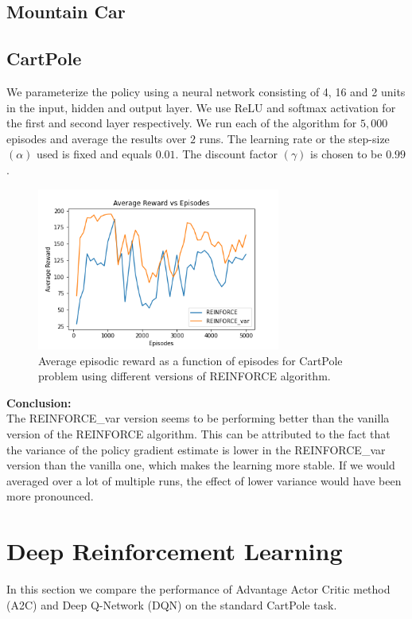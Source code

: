 \documentclass{article}
\begin{document}
    \subsection{Mountain Car}

    \subsection{CartPole}
    We parameterize the policy using a neural network consisting of 4, 16 and 2 units in the input, hidden and output layer. We use ReLU and softmax activation for
    the first and second layer respectively. We run each of the algorithm for $5,000$ episodes and average the results over $2$ runs. 
    The learning rate or the step-size $(\alpha)$ used is fixed and equals $0.01$. The discount factor $(\gamma)$ is chosen to be $0.99$.
    
    \begin{figure}[H]
        \graphicspath{ {../Experiments/Linear_Function_Approximation/} }
        \begin{center}
        \includegraphics[width=8cm]{Cartpole_reinforce.png}
        \end{center}
        \caption{Average episodic reward as a function of episodes for CartPole problem using different versions of REINFORCE algorithm.}
        \label{}
    \end{figure}

    \noindent %
    \textbf{Conclusion:} \\
    The REINFORCE\_var version seems to be performing better than the vanilla version of the REINFORCE algorithm. This can be
    attributed to the fact that the variance of the policy gradient estimate is lower in the REINFORCE\_var version than the
    vanilla one, which makes the learning more stable. If we would averaged over a lot of multiple runs, the effect of lower
    variance would have been more pronounced.
    
\section{Deep Reinforcement Learning}
    In this section we compare the performance of Advantage Actor Critic method (A2C) and Deep Q-Network (DQN) on the standard CartPole task.
\end{document}
